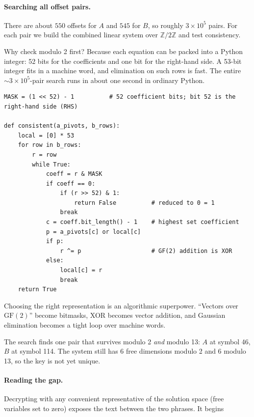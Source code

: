 \documentclass[11pt]{article}
\begin{document}
\paragraph{Searching all offset pairs.} There are about $550$ offsets for $A$
and $545$ for $B$, so roughly $3\times10^5$ pairs.  For each pair we build the
combined linear system over $\mathbb{Z}/2\mathbb{Z}$ and test consistency.

Why check modulo 2 first?  Because each equation can be packed into a Python
integer: 52 bits for the coefficients and one bit for the right-hand side.  A
53-bit integer fits in a machine word, and elimination on such rows is fast.
The entire $\sim3\times10^5$-pair search runs in about one second in ordinary
Python.

\begin{lstlisting}
MASK = (1 << 52) - 1          # 52 coefficient bits; bit 52 is the right-hand side (RHS)

def consistent(a_pivots, b_rows):
    local = [0] * 53
    for row in b_rows:
        r = row
        while True:
            coeff = r & MASK
            if coeff == 0:
                if (r >> 52) & 1:
                    return False          # reduced to 0 = 1
                break
            c = coeff.bit_length() - 1    # highest set coefficient
            p = a_pivots[c] or local[c]
            if p:
                r ^= p                    # GF(2) addition is XOR
            else:
                local[c] = r
                break
    return True
\end{lstlisting}

\begin{lesson}
Choosing the right representation is an algorithmic superpower.  ``Vectors
over $\mathrm{GF}(2)$'' become bitmasks, XOR becomes vector addition, and
Gaussian elimination becomes a tight loop over machine words.
\end{lesson}

The search finds one pair that survives modulo 2 \emph{and} modulo 13: $A$ at
symbol 46, $B$ at symbol 114.  The system still has 6 free dimensions modulo 2
and 6 modulo 13, so the key is not yet unique.

\paragraph{Reading the gap.}  Decrypting with any convenient representative of
the solution space (free variables set to zero) exposes the text between the
two phrases.  It begins
\end{document}
